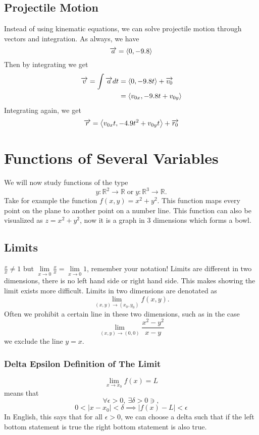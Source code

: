 \documentclass[12pt]{article}
\theoremstyle{plain} %
\theoremstyle{definition}
\theoremstyle{definition}
\theoremstyle{definition}
\theoremstyle{remark}
\newcommand{\vecr}{\vv{r}}
\newcommand{\angled}[1]{\left\langle {#1} \right\rangle}
\renewcommand\abs[1]{\mid #1 \mid}
\newcommand*{\vv}[1]{\overrightarrow{\mkern0mu#1}}
\begin{document}
\subsection{Projectile Motion}
Instead of using kinematic equations, we can solve projectile motion through vectors and integration. As always, we have
\[ \vv{a} = \angled{0,-9.8} \]
Then by integrating we get
\begin{align*}
    \vv{v} = \int{\vv{a}dt} &= \angled{0,-9.8t}+\vv{v_0} \\
    & = \angled{v_{0x},-9.8t + v_{0y}}
\end{align*}
Integrating again, we get
\[ \vecr = \angled{v_{0x}t,-4.9t^2 + v_{0y}t} + \vv{r_0} \]

\section{Functions of Several Variables}
We will now study functions of the type
\[ y:\mathbb{R}^2 \rightarrow \mathbb{R} \; \text{or} \; y:\mathbb{R}^3 \rightarrow \mathbb{R} .\]
Take for example the function $f(x,y) = x^2 + y^2$. This function maps every point on the plane to another point on a number line. This function can also be visualized as $z=x^2+y^2$, now it is a graph in $3$ dimensions which forms a bowl.
\subsection{Limits}
$\frac{x}{x} \neq 1$ but $\lim\limits_{x\rightarrow0} \frac{x}{x} = \lim\limits_{x\rightarrow0} 1$, remember your notation!
Limits are different in two dimensions, there is no left hand side or right hand side. This makes showing the limit exists more difficult. Limits in two dimensions are denotated as
\[ \lim_{(x,y)\to(x_0,y_0)} f(x,y) .\]
Often we prohibit a certain line in these two dimensions, such as in the case
\[ \lim_{(x,y)\to(0,0)} \frac{x^2-y^2}{x-y} \]
we exclude the line $y=x$.
\subsubsection{Delta Epsilon Definition of The Limit}
\[
    \lim_{x\to x_0}f(x) = L \] means that
\[ \forall \epsilon > 0,  \ \exists  \delta > 0 \ni ,\]
\[ 0 < \abs{x-x_0} < \delta \implies \abs{f(x)-L} < \epsilon \]
In English, this says that for all $\epsilon > 0$, we can choose a delta such that if the left bottom statement is true the right bottom statement is also true.
\end{document}
